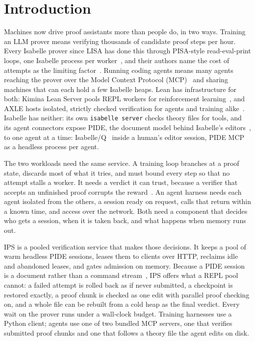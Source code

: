 \documentclass[11pt]{article}
\newcommand{\code}[1]{\colorbox{gray!12}{\texttt{\vphantom{Ag}#1}}}
\begin{document}
\section{Introduction}

Machines now drive proof assistants more than people do, in two ways.
Training an LLM prover means verifying thousands of candidate proof steps
per hour. Every Isabelle prover since LISA has done this through
PISA-style read-eval-print loops, one Isabelle process per
worker~\cite{jiang2021lisa,jiang2022thor,jiang2023dsp,mikula2024magnushammer},
and their authors name the cost of attempts as the limiting
factor~\cite{jiang2023dsp,mikula2024magnushammer}. Running coding agents
means many agents reaching the prover over the Model Context Protocol
(MCP)~\cite{anthropic2024mcp} and sharing machines that can each hold a
few Isabelle heaps. Lean has infrastructure for both: Kimina Lean Server
pools REPL workers for reinforcement
learning~\cite{santos2025kimina,deepseek2024proverv15}, and AXLE hosts
isolated, strictly checked verification for agents and training
alike~\cite{xin2026axle}. Isabelle has neither: its own
\code{isabelle server} checks theory files for tools, and its agent
connectors expose PIDE, the document model behind Isabelle's
editors~\cite{wenzel2014pide}, to one agent at a time: Isabelle/Q~\cite{awslabs2026autocorrode} inside a
human's editor session, PIDE MCP~\cite{kappelmann2026pidemcp} as a
headless process per agent.

The two workloads need the same service. A training loop branches at a
proof state, discards most of what it tries, and must bound every step so
that no attempt stalls a worker. It needs a verdict it can trust, because
a verifier that accepts an unfinished proof corrupts the
reward~\cite{deepseek2025proverv2,xin2026axle}. An agent harness needs
each agent isolated from the others, a session ready on request, calls
that return within a known time, and access over the network. Both need
a component that decides who gets a session, when it is taken back, and
what happens when memory runs out.

IPS is a pooled verification service that makes those decisions. It keeps
a pool of warm headless PIDE sessions, leases them to clients over HTTP,
reclaims idle and abandoned leases, and gates admission on memory. Because
a PIDE session is a document rather than a command
stream~\cite{wenzel2012repl}, IPS offers what a REPL pool cannot: a failed
attempt is rolled back as if never submitted, a checkpoint is restored
exactly, a proof chunk is checked as one edit with parallel proof checking
on, and a whole file can be rebuilt from a cold heap as the final verdict.
Every wait on the prover runs under a wall-clock budget. Training
harnesses use a Python client; agents use one of two bundled MCP servers,
one that verifies submitted proof chunks and one that follows a theory
file the agent edits on disk.
\end{document}
